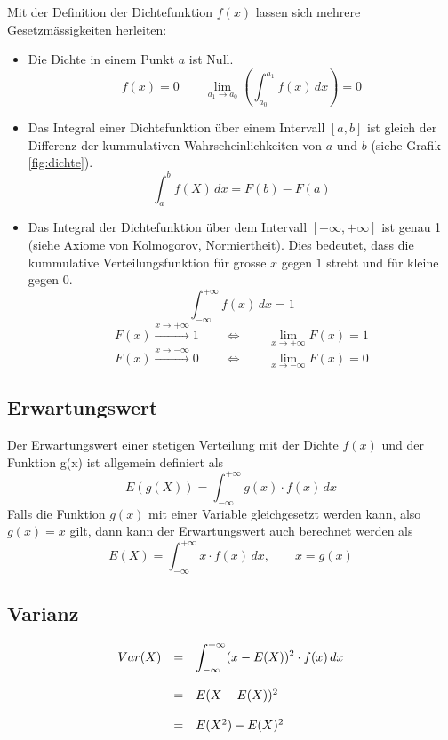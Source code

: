 Mit der Definition der Dichtefunktion $f(x)$ lassen sich mehrere 
Gesetzmässigkeiten herleiten:
\begin{itemize}
	\item Die Dichte in einem Punkt $a$ ist Null.
		\[ f(x) = 0 
			\qquad \lim_{a_1 \rightarrow a_0} \left(
				\int_{a_0}^{a_1} f(x)\,dx \right) = 0   \]
	\item Das Integral einer Dichtefunktion über einem Intervall
		$[a,b]$ ist gleich der Differenz der kummulativen
		Wahrscheinlichkeiten von $a$ und $b$ (siehe Grafik 
		\ref{fig:dichte}).
		\[ \int_a^b f(X)\, dx = F(b) - F(a) \]
	\item Das Integral der Dichtefunktion über dem Intervall 
		$[-\infty, +\infty]$ ist genau 1 
		(siehe \gls{Axiome von Kolmogorov}, \gls{Normiertheit}).
		Dies bedeutet, dass die kummulative Verteilungsfunktion
		für grosse $x$ gegen $1$ strebt und für kleine gegen $0$.
		\[ \int_{-\infty}^{+\infty} f(x)\, dx = 1 \]
		\[ F(x) \xrightarrow{x \rightarrow +\infty} 1
			\qquad \Leftrightarrow \qquad 
			\lim_{x \rightarrow + \infty} 
				F(x) = 1 \]
		\[ F(x) \xrightarrow{x \rightarrow -\infty} 0 
			\qquad \Leftrightarrow \qquad
			\lim_{x \rightarrow - \infty} 
				F(x) = 0 \]
\end{itemize}

\subsection{Erwartungswert}
Der Erwartungswert einer stetigen Verteilung mit der Dichte $f(x)$ und 
der Funktion g(x) ist allgemein definiert als
\[ 
	E(g(X)) = \int_{-\infty}^{+\infty} g(x) \cdot f(x)\, dx
\]
Falls die Funktion $g(x)$ mit einer Variable gleichgesetzt werden
kann, also $g(x)=x$ gilt, dann kann der Erwartungswert auch berechnet
werden als
\[  
	E(X) = \int_{-\infty}^{+\infty} x \cdot f(x)\, dx,
		\qquad x = g(x)
\]

\subsection{Varianz}
\[ \begin{array}{l c l} 
	Var(X) 
		& = 
		& \displaystyle 
			\int_{-\infty}^{+\infty} 
			(x-E(X))^2 \cdot f(x)\, dx \\
		& & \\
		& = 
		& E(X-E(X))^2 \\
		& & \\
		& = 
		& E(X^2) - E(X)^2
\end{array} \]

